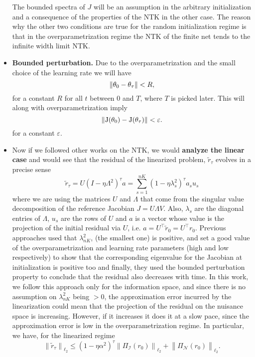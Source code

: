 \documentclass[a4paper]{article}
\let\temp\epsilon
\let\epsilon\varepsilon
\let\varepsilon\temp
\begin{document}
\begin{itemize}
        The bounded spectra of $J$ will be an assumption in the arbitrary initialization and a consequence of the properties of the NTK in the other case. The reason why the other two conditions are true for the random initialization regime is that in the overparametrization regime the NTK of the finite net tends to the infinite width limit NTK.
    \item \textbf{Bounded perturbation.} Due to the overparametrization and the small choice of the learning rate we will have 
        \[
            \mathrm{\left\lVert\theta_0-\theta_\tau\right\rVert} < R,
        \] 
        for a constant $R$ for all $t$ between $0$ and $T$, where $T$ is picked later. This will along with overparametrization imply 
        \[
        \norm{J(\theta_0)-J(\theta_\tau)} < \epsilon.
        \] 
        for a constant $\epsilon$.
    \item Now if we followed other works on the NTK, we would \textbf{analyze the linear case} and would see that the residual of the linearized problem, $\tilde{r}_\tau$ evolves in a precise sense
        \[
        \widetilde{r}_{\tau}=U\left(I-\eta \Lambda^{2}\right)^{\tau} a=\sum_{s=1}^{n K}\left(1-\eta \lambda_{s}^{2}\right)^{\tau} a_{s} u_{s}
        \] 
        where we are using the matrices $U$ and $\Lambda$ that come from the singular value decomposition of the reference Jacobian $J = U\Lambda V$. Also, $\lambda_s$ are the diagonal entries of $\Lambda$, $u_s$ are the rows of $U$ and $a$ is a vector whose value is the projection of the initial residual via $U$, i.e. $a = U^\top\tilde{r}_0 = U^\top r_0$. Previous approaches used that $\lambda_{nK}^2$, (the smallest one) is positive, and set a good value of the overparametrization and learning rate parameters (high and low respectively) to show that the corresponding eigenvalue for the Jacobian at initialization is positive too and finally, they used the bounded perturbation property to conclude that the residual also decreases with time. In this work, we follow this approach only for the information space, and since there is no assumption on $\lambda_{nK}^2$ being $>0$, the approximation error incurred by the linearization could mean that the projection of the residual on the nuisance space is increasing. However, if it increases it does it at a slow pace, since the approximation error is low in the overparametrization regime. In particular, we have, for the linearized regime
        \[
        \left\|\widetilde{r}_{\tau}\right\|_{\ell_{2}} \leq\left(1-\eta \alpha^{2}\right)^{\tau}\left\|\Pi_{\mathcal{I}}\left(r_{0}\right)\right\|_{\ell_{2}}+\left\|\Pi_{\mathcal{N}}\left(r_{0}\right)\right\|_{\ell_{2}}.
\]
\end{itemize}
\end{document}
